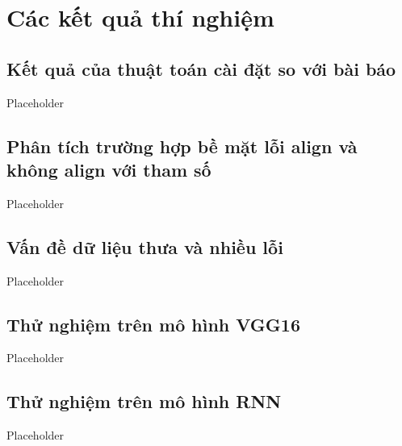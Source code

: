 \section{Các kết quả thí nghiệm}

\subsection{Kết quả của thuật toán cài đặt so với bài báo}

Placeholder

\subsection{Phân tích trường hợp bề mặt lỗi align và không align với tham số}

Placeholder

\subsection{Vấn đề dữ liệu thưa và nhiều lỗi}

Placeholder

\subsection{Thử nghiệm trên mô hình VGG16}

Placeholder

\subsection{Thử nghiệm trên mô hình RNN}

Placeholder